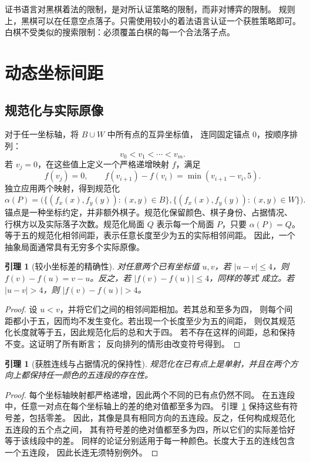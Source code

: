 \documentclass[11pt]{article}
\newtheorem{lemma}[theorem]{引理}
\theoremstyle{definition}
\theoremstyle{remark}
\newcommand{\A}{\alpha}
\begin{document}
证书语言对黑棋着法的限制，是对所认证策略的限制，而非对博弈的限制。
规则上，黑棋可以在任意空点落子。只需使用较小的着法语言认证一个获胜策略即可。
白棋不受类似的搜索限制：必须覆盖白棋的每一个合法落子点。

\section{动态坐标间距}
\label{sec:gaps}
\subsection{规范化与实际原像}
对于任一坐标轴，将 $B\cup W$ 中所有点的互异坐标值，
连同固定锚点 $0$，按顺序排列：
\[
 v_0< v_1<\cdots<v_m.
\]
若 $v_j=0$，在这些值上定义一个严格递增映射 $f$，满足
\[
 f(v_j)=0,\qquad f(v_{i+1})-f(v_i)=\min(v_{i+1}-v_i,5).
\]
独立应用两个映射，得到规范化
\[
 \A(P)=\bigl(\{(f_x(x),f_y(y)):(x,y)\in B\},
             \{(f_x(x),f_y(y)):(x,y)\in W\}\bigr).
\]
锚点是一种坐标约定，并非额外棋子。规范化保留颜色、棋子身份、占据情况、
行棋方以及实际落子次数。规范化局面 $Q$ 表示每一个局面 $P$，只要 $\A(P)=Q$。
等于五的规范化相邻间距，表示任意长度至少为五的实际相邻间距。
因此，一个抽象局面通常具有无穷多个实际原像。

\begin{lemma}[较小坐标差的精确性]
\label{lem:short}
对任意两个已有坐标值 $u,v$，若 $|u-v|\leq4$，则
$f(v)-f(u)=v-u$。反之，若 $|f(v)-f(u)|\leq4$，同样的等式
成立。若 $|u-v|>4$，则 $|f(v)-f(u)|>4$。
\end{lemma}
\begin{proof}
设 $u<v$，并将它们之间的相邻间距相加。若其总和至多为四，
则每个间距都小于五，因而均不发生变化。若出现一个长度至少为五的间距，
则仅其规范化长度就等于五，因此规范化后的总和大于四。
若不存在这样的间距，总和保持不变。这证明了所有断言；
反向排列的情形由改变符号得到。
\end{proof}

\begin{lemma}[获胜连线与占据情况的保持性]
\label{lem:five}
规范化在已有点上是单射，并且在两个方向上都保持任一颜色的五连段的存在性。
\end{lemma}
\begin{proof}
每个坐标轴映射都严格递增，因此两个不同的已有点仍然不同。
在五连段中，任意一对点在每个坐标轴上的差的绝对值都至多为四。
引理~\ref{lem:short} 保持这些有符号差，包括零差。
因此，其像是具有相同方向的五连段。反之，任何构成规范化五连段的五个点之间，
其有符号差的绝对值都至多为四，所以它们的实际差恰好等于该线段中的差。
同样的论证分别适用于每一种颜色。长度大于五的连线包含一个五连段，
因此长连无须特别例外。
\end{proof}
\end{document}
